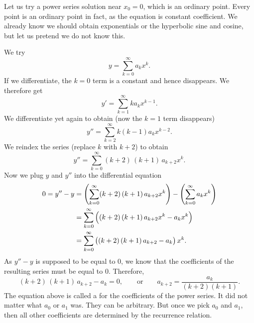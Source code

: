 \documentclass{ximera}
\begin{document}
\begin{exampleSol}
    Let us try a power series solution near $x_0 = 0$, which is an ordinary point.  Every point is an ordinary point in fact, as the equation is constant coefficient.  We already know we should obtain exponentials or the hyperbolic sine and cosine, but let us pretend we do not know this.
    
    We try
    \begin{equation*}
        y = \sum_{k=0}^\infty a_k x^k .
    \end{equation*}
    If we differentiate, the $k=0$ term is a constant and hence disappears. We therefore get
    \begin{equation*}
        y' = \sum_{k=1}^\infty k a_k x^{k-1} .
    \end{equation*}
    We differentiate yet again to obtain (now the $k=1$ term disappears)
    \begin{equation*}
        y'' = \sum_{k=2}^\infty k(k-1) a_k x^{k-2} .
    \end{equation*}
    We reindex the series (replace $k$ with $k+2$) to obtain
    \begin{equation*}
        y'' = \sum_{k=0}^\infty (k+2)\,(k+1) \, a_{k+2} x^k .
    \end{equation*}
    Now we plug $y$ and $y''$ into the differential equation
    \begin{equation*}
        \begin{split}
            0 = y''-y 
            & = \Biggl( \sum_{k=0}^\infty (k+2)\,(k+1) \, a_{k+2} x^k  \Biggr) - \Biggl( \sum_{k=0}^\infty a_k x^k \Biggr) \\
            & = \sum_{k=0}^\infty \,\Bigl( (k+2)\,(k+1) \, a_{k+2} x^k  - a_k x^k \Bigr) \\
            & = \sum_{k=0}^\infty \,\bigl( (k+2)\,(k+1) \,a_{k+2} - a_k \bigr) \, x^k  .
        \end{split}
    \end{equation*}
    As $y'' - y$ is supposed to be equal to 0, we know that the coefficients of the resulting series must be equal to 0.  Therefore,
    \begin{equation*}
        (k+2)\,(k+1) \,a_{k+2} - a_k = 0 ,
        \qquad \text{or} \qquad
        a_{k+2} = \frac{a_k}{(k+2)(k+1)} .
    \end{equation*}
    The equation above is called a \emph{} for the coefficients of the power series. It did not matter what $a_0$ or $a_1$ was.  They can be arbitrary. But once we pick $a_0$ and $a_1$, then all other coefficients are determined by the recurrence relation.
    

\end{exampleSol}
\end{document}
